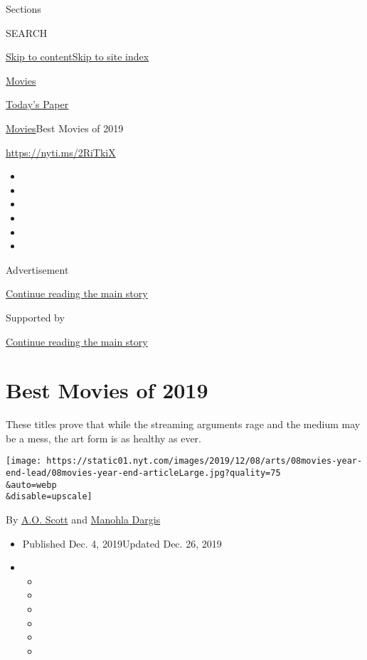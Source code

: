 Sections

SEARCH

\protect\hyperlink{site-content}{Skip to
content}\protect\hyperlink{site-index}{Skip to site index}

\href{https://www.nytimes.com/section/movies}{Movies}

\href{https://myaccount.nytimes.com/auth/login?response_type=cookie\&client_id=vi}{}

\href{https://www.nytimes.com/section/todayspaper}{Today's Paper}

\href{/section/movies}{Movies}\textbar{}Best Movies of 2019

\href{https://nyti.ms/2RiTkiX}{https://nyti.ms/2RiTkiX}

\begin{itemize}
\item
\item
\item
\item
\item
\item
\end{itemize}

Advertisement

\protect\hyperlink{after-top}{Continue reading the main story}

Supported by

\protect\hyperlink{after-sponsor}{Continue reading the main story}

\hypertarget{best-movies-of-2019}{%
\section{Best Movies of 2019}\label{best-movies-of-2019}}

These titles prove that while the streaming arguments rage and the
medium may be a mess, the art form is as healthy as ever.

\texttt{[image: https://static01.nyt.com/images/2019/12/08/arts/08movies-year-end-lead/08movies-year-end-articleLarge.jpg?quality=75\\\&auto=webp\\\&disable=upscale]}

By \href{https://www.nytimes.com/by/a-o--scott}{A.O. Scott} and
\href{https://www.nytimes.com/by/manohla-dargis}{Manohla Dargis}

\begin{itemize}
\item
  Published Dec. 4, 2019Updated Dec. 26, 2019
\item
  \begin{itemize}
  \item
  \item
  \item
  \item
  \item
  \item
  \end{itemize}
\end{itemize}


